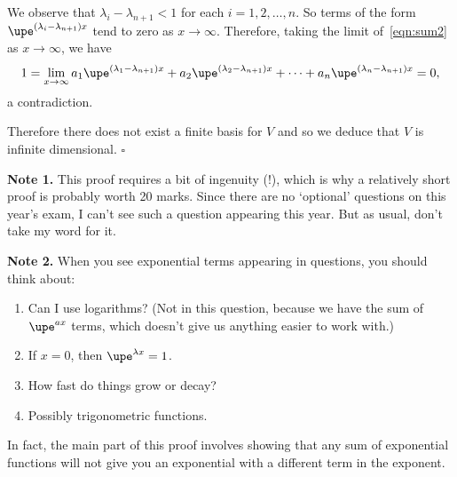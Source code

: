 \documentclass[english,12pt,a4paper]{scrartcl}
\begin{document}
\begin{itemize}
    We observe that $\lambda_i - \lambda_{n + 1} < 1$ for each $i = 1, 2, 
    \dots, n$. So terms of the form $\upe^{(\lambda_i - \lambda_{n + 1}) x}$ 
    tend to zero as $x \to \infty$. Therefore, taking the limit 
    of~\eqref{eqn:sum2} as $x \to \infty$, we have
    \[
      1 = \lim_{x \to \infty} a_1 \upe^{(\lambda_1 - \lambda_{n + 1}) x} + a_2 
      \upe^{(\lambda_2 - \lambda_{n + 1}) x} + \dots + a_n \upe^{(\lambda_n - 
        \lambda_{n + 1}) x} = 0,
    \]
    a contradiction.
    
    Therefore there does not exist a finite basis for $V$ and so we deduce that 
    $V$ is infinite dimensional. \hfill $\square$

    \textbf{Note 1.} This proof requires a bit of ingenuity (!), which is why a 
    relatively short proof is probably worth 20 marks. Since there are no 
    `optional' questions on this year's exam, I can't see such a question 
    appearing this year. But as usual, don't take my word for it.

    \textbf{Note 2.} When you see exponential terms appearing in questions, you 
    should think about:
    \begin{enumerate}
      \item Can I use logarithms? (Not in this question, because we have the 
        sum of $\upe^{ax}$ terms, which doesn't give us anything easier to work 
        with.)
      \item If $x = 0$, then $\upe^{\lambda x} = 1$.
      \item How fast do things grow or decay?
      \item Possibly trigonometric functions.
    \end{enumerate}
    In fact, the main part of this proof involves showing that any sum of 
    exponential functions will not give you an exponential with a different 
    term in the exponent.
\end{itemize}
\end{document}
